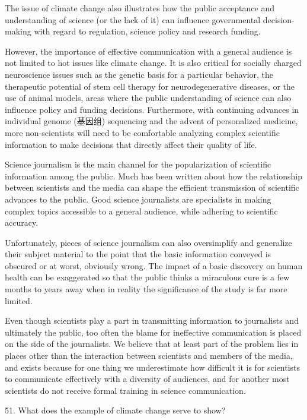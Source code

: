 \documentclass[UTF8,11pt]{ctexart}
\begin{document}
The issue of climate change also illustrates how the public acceptance and understanding of science (or the lack of it) can influence governmental decision-making with regard to regulation, science policy and research funding.


However, the importance of effective communication with a general audience is not limited to hot issues like climate change. It is also critical for socially charged neuroscience issues such as the genetic basis for a particular behavior, the therapeutic potential of stem cell therapy for neurodegenerative diseases, or the use of animal models, areas where the public understanding of science can also influence policy and funding decisions. Furthermore, with continuing advances in individual genome (基因组) sequencing and the advent of personalized medicine, more non-scientists will need to be comfortable analyzing complex scientific information to make decisions that directly affect their quality of life.


Science journalism is the main channel for the popularization of scientific information among the public. Much has been written about how the relationship between scientists and the media can shape the efficient transmission of scientific advances to the public. Good science journalists are specialists in making complex topics accessible to a general audience, while adhering to scientific accuracy.


Unfortunately, pieces of science journalism can also oversimplify and generalize their subject material to the point that the basic information conveyed is obscured or at worst, obviously wrong. The impact of a basic discovery on human health can be exaggerated so that the public thinks a miraculous cure is a few months to years away when in reality the significance of the study is far more limited.


Even though scientists play a part in transmitting information to journalists and ultimately the public, too often the blame for ineffective communication is placed on the side of the journalists. We believe that at least part of the problem lies in places other than the interaction between scientists and members of the media, and exists because for one thing we underestimate how difficult it is for scientists to communicate effectively with a diversity of audiences, and for another most scientists do not receive formal training in science communication.


51. What does the example of climate change serve to show?
\end{document}
